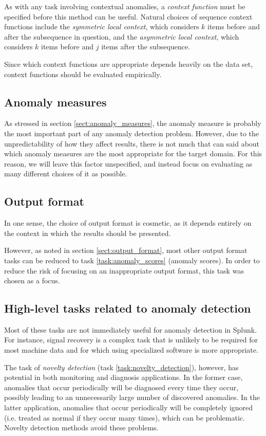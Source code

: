 As with any task involving contextual anomalies, a \emph{context function} must be specified before this method can be useful. Natural choices of sequence context functions include the \emph{symmetric local context}, which considers $k$ items before and after the subsequence in question, and the \emph{asymmetric local context}, which considers $k$ items before and $j$ items after the subsequence.

Since which context functions are appropriate depends heavily on the data set, context functions should be evaluated empirically.

\subsection{Anomaly measures}

As stressed in section \ref{sect:anomaly_measures}, the anomaly measure is probably the most important part of any anomaly detection problem. However, due to the unpredictability of how they affect results, there is not much that can said about which anomaly measures are the most appropriate for the target domain. For this reason, we will leave this factor unspecified, and instead focus on evaluating as many different choices of it as possible.

\subsection{Output format}

In one sense, the choice of output format is cosmetic, as it depends entirely on the context in which the results should be presented. 

However, as noted in section \ref{sect:output_format}, most other output format tasks can be reduced to task \ref{task:anomaly_scores} (anomaly scores). In order to reduce the risk of focusing on an inappropriate output format, this task was chosen as a focus.

\subsection{High-level tasks related to anomaly detection}

Most of these tasks are not immediately useful for anomaly detection in Splunk. For instance, signal recovery is a complex task that is unlikely to be required for most machine data and for which using specialized software is more appropriate.

The task of \emph{novelty detection} (task \ref{task:novelty_detection}), however, has potential in both monitoring and diagnosis applications. In the former case, anomalies that occur periodically will be diagnosed every time they occur, possibly leading to an unnecessarily large number of discovered anomalies. In the latter application, anomalies that occur periodically will be completely ignored (i.e. treated as normal if they occur many times), which can be problematic. Novelty detection methods avoid these problems.

